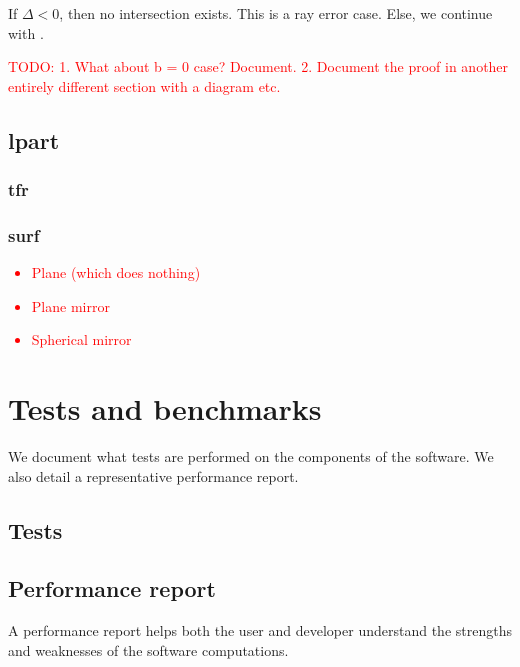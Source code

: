 If $\Delta < 0$, then no intersection exists. This is a ray error case. Else,
we continue with .

\textcolor{red}{TODO: 1. What about b = 0 case? Document.
2. Document the proof in another entirely different section with
   a diagram etc.}

\subsection{lpart}

\subsubsection{tfr}

\subsubsection{surf}
\textcolor{red}{
\begin{itemize}
\item Plane (which does nothing)
\item Plane mirror
\item Spherical mirror
\end{itemize}}

\section{Tests and benchmarks}
We document what tests are performed on the components of the software.
We also detail a representative performance report.

\subsection{Tests}

\subsection{Performance report}
A performance report helps both the user and developer understand the strengths
and weaknesses of the software computations.
